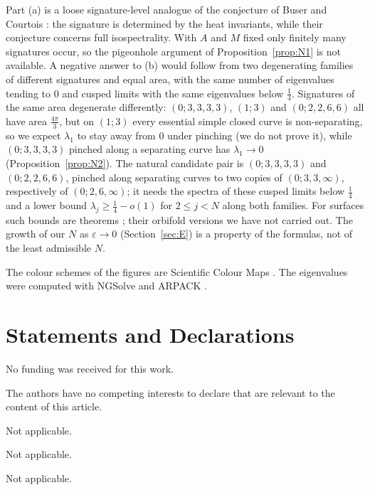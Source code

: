 \documentclass[pdflatex,sn-mathphys-num]{sn-jnl}
\theoremstyle{thmstyleone}%
\theoremstyle{thmstylethree}%
\begin{document}
Part (a) is a loose signature-level analogue of the conjecture of Buser and Courtois \cite[pp.~523--524]{busercourtois1990}: the signature is determined by the heat invariants, while their conjecture concerns full isospectrality. With $A$ and $M$ fixed only finitely many signatures occur, so the pigeonhole argument of Proposition~\ref{prop:N1} is not available. A negative answer to (b) would follow from two degenerating families of different signatures and equal area, with the same number of eigenvalues tending to $0$ and cusped limits with the same eigenvalues below $\frac14$. Signatures of the same area degenerate differently: $(0;3,3,3,3)$, $(1;3)$ and $(0;2,2,6,6)$ all have area $\frac{4\pi}3$, but on $(1;3)$ every essential simple closed curve is non-separating, so we expect $\lambda_1$ to stay away from $0$ under pinching (we do not prove it), while $(0;3,3,3,3)$ pinched along a separating curve has $\lambda_1\to0$ (Proposition~\ref{prop:N2}). The natural candidate pair is $(0;3,3,3,3)$ and $(0;2,2,6,6)$, pinched along separating curves to two copies of $(0;3,3,\infty)$, respectively of $(0;2,6,\infty)$; it needs the spectra of these cusped limits below $\frac14$ and a lower bound $\lambda_j\ge\frac14-o(1)$ for $2\le j<N$ along both families. For surfaces such bounds are theorems \cite{hjl1997,otalrosas2009,bmm2017}; their orbifold versions we have not carried out. The growth of our $N$ as $\varepsilon\to0$ (Section~\ref{sec:E}) is a property of the formulas, not of the least admissible $N$.

\backmatter

The colour schemes of the figures are Scientific Colour Maps \cite{crameri2023,crameri2020}. The eigenvalues were computed with NGSolve \cite{ngsolve,schoberl1997} and ARPACK \cite{arpack1998}.

\section*{Statements and Declarations}

No funding was received for this work.

The authors have no competing interests to declare that are relevant to the content of this article.

Not applicable.

Not applicable.

Not applicable.
\end{document}
